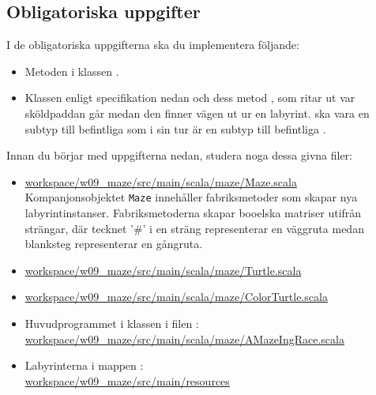 \subsection{Obligatoriska uppgifter}

I de obligatoriska uppgifterna ska du implementera följande:
\begin{itemize}
\item Metoden  i klassen .

\item Klassen  enligt specifikation nedan och dess metod , som ritar ut var sköldpaddan går medan den finner vägen ut ur en labyrint.  ska vara en subtyp till befintliga  som i sin tur är en subtyp till befintliga .

\end{itemize}


\noindent Innan du börjar med uppgifterna nedan, studera noga dessa givna filer:
\begin{itemize}
\item
\href{https://github.com/lunduniversity/introprog/tree/master/workspace/w09_maze/src/main/scala/maze/Maze.scala}{workspace/w09\_maze/src/main/scala/maze/Maze.scala} \\
Kompanjonsobjektet \texttt{Maze} innehåller fabriksmetoder som skapar nya labyrintinstanser. Fabriksmetoderna  skapar booelska matriser utifrån strängar, där tecknet '\#' i en sträng representerar en väggruta medan blanksteg representerar en gångruta.

\item 
\href{https://github.com/lunduniversity/introprog/tree/master/workspace/w09_maze/src/main/scala/maze/Turtle.scala}{workspace/w09\_maze/src/main/scala/maze/Turtle.scala}

\item 
\href{https://github.com/lunduniversity/introprog/tree/master/workspace/w09_maze/src/main/scala/maze/ColorTurtle.scala}{workspace/w09\_maze/src/main/scala/maze/ColorTurtle.scala}

\item Huvudprogrammet  i klassen  i filen :
\href{https://github.com/lunduniversity/introprog/tree/master/workspace/w09_maze/src/main/scala/maze/AMazeIngRace.scala}{workspace/w09\_maze/src/main/scala/maze/AMazeIngRace.scala}

\item Labyrinterna i mappen :\\
\href{https://github.com/lunduniversity/introprog/tree/master/workspace/w09_maze/src/main/resources}{workspace/w09\_maze/src/main/resources}

\end{itemize}

